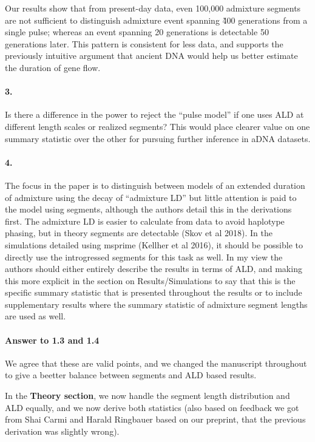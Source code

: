 \documentclass[11pt]{article}
\let\oldparagraph\paragraph
\renewcommand{\paragraph}[1]{\oldparagraph{#1}\mbox{}}
\begin{document}
Our results show that from present-day data, even 100,000 admixture segments are not sufficient to distinguish admixture event spanning \~400 generations from a single pulse; whereas an event spanning 20 generations is detectable 50 generations later. This pattern is consistent for less data, and supports the previously intuitive argument that ancient DNA would help us better estimate the duration of gene flow.


\paragraph{3.}
Is there a difference in the power to reject the “pulse model” if one uses ALD at different length scales or realized segments? This would place clearer value on one summary statistic over the other for pursuing further inference in aDNA datasets. 

\paragraph{4.}
The focus in the paper is to distinguish between models of an extended duration of admixture using the decay of “admixture LD” but little attention is paid to the model using segments, although the authors detail this in the derivations first. The admixture LD is easier to calculate from data to avoid haplotype phasing, but in theory segments are detectable (Skov et al 2018). In the simulations detailed using msprime (Kellher et al 2016), it should be possible to directly use the introgressed segments for this task as well. In my view the authors should either entirely describe the results in terms of ALD, and making this more explicit in the section on Results/Simulations to say that this is the specific summary statistic that is presented throughout the results or to include supplementary results where the summary statistic of admixture segment lengths are used as well. 



\paragraph{Answer to 1.3 and 1.4}
We agree that these are valid points, and we changed the manuscript throughout to give a beetter balance between segments and ALD based results. 

In the \textbf{Theory section}, we now handle the segment length distribution and ALD equally, and we now derive both statistics (also based on feedback we got from Shai Carmi and Harald Ringbauer based on our preprint, that the previous derivation was slightly wrong).
\end{document}
